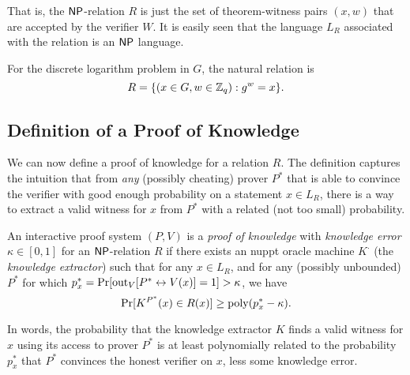 \documentclass[11pt]{article}
\begin{document}
That is, the $\mathsf{NP}$-relation $R$ is just the set of theorem-witness
pairs $(x,w)$ that are accepted by the verifier $W$.  It is easily
seen that the language $L_{R}$ associated with the relation is an
$\mathsf{NP}$ language.

\begin{example}
  \label{ex:dlog-relation}
  For the discrete logarithm problem in $G$, the natural relation
  is \[ R = \{(x \in G, w \in \mathbb{Z}_q) : g^{w} = x\}. \]
\end{example}

\subsection{Definition of a Proof of Knowledge}
\label{sec:defin-proof-knowl}

We can now define a proof of knowledge for a relation $R$.  The
definition captures the intuition that from \emph{any} (possibly
cheating) prover $P^{*}$ that is able to convince the verifier with
good enough probability on a statement $x \in L_{R}$, there is a way
to extract a valid witness for $x$ from $P^{*}$ with a related (not
too small) probability.

\begin{definition}
  \label{def:pok}
  An interactive proof system $(P,V)$ is a \emph{proof of knowledge}
  with \emph{knowledge error} $\kappa \in [0,1]$ for an $\mathsf{NP}$-relation
  $R$ if there exists an nuppt oracle machine $K^{\cdot}$ (the
  \emph{knowledge extractor}) such that for any $x \in L_{R}$, and for
  any (possibly unbounded) $P^{*}$ for which $p^{*}_{x} =
  \Pr[\text{out}_{V}[P^{*} \leftrightarrow V(x)] = 1] > \kappa$, we have \[
  \Pr[K^{P^{*}}(x) \in R(x)] \geq \operatorname{poly}(p^{*}_{x} - \kappa). \]
\end{definition}

In words, the probability that the knowledge extractor $K$ finds a
valid witness for $x$ using its access to prover $P^{*}$ is at least
polynomially related to the probability $p^{*}_{x}$ that $P^{*}$
convinces the honest verifier on $x$, less some knowledge error.
\end{document}
